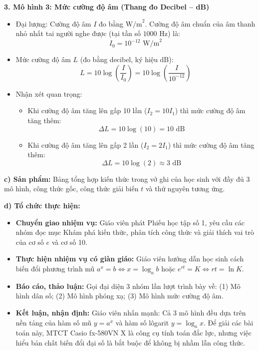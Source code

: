 \documentclass[12pt, a4paper]{article}
\begin{document}
\textbf{3. Mô hình 3: Mức cường độ âm (Thang đo Decibel -- dB)}
\begin{itemize}[leftmargin=0.6cm]
    \item Đại lượng: Cường độ âm $I$ đo bằng $\text{W/m}^2$. Cường độ âm chuẩn của âm thanh nhỏ nhất tai người nghe được (tại tần số $1000\text{ Hz}$) là:
    $$I_0 = 10^{-12} \text{ W/m}^2$$
    \item Mức cường độ âm $L$ (đo bằng decibel, ký hiệu $\text{dB}$):
    $$L = 10 \log\left(\dfrac{I}{I_0}\right) = 10 \log\left(\dfrac{I}{10^{-12}}\right)$$
    \item Nhận xét quan trọng:
    \begin{itemize}
        \item Khi cường độ âm tăng lên gấp 10 lần ($I_2 = 10 I_1$) thì mức cường độ âm tăng thêm:
        $$\Delta L = 10 \log(10) = 10 \text{ dB}$$
        \item Khi cường độ âm tăng lên gấp 2 lần ($I_2 = 2 I_1$) thì mức cường độ âm tăng thêm:
        $$\Delta L = 10 \log(2) \approx 3 \text{ dB}$$
    \end{itemize}
\end{itemize}

\noindent \textbf{c) Sản phẩm:}
Bảng tổng hợp kiến thức trong vở ghi của học sinh với đầy đủ 3 mô hình, công thức gốc, công thức giải biến $t$ và thứ nguyên tương ứng.

\noindent \textbf{d) Tổ chức thực hiện:}
\begin{itemize}[leftmargin=0.6cm]
    \item \textbf{Chuyển giao nhiệm vụ:} Giáo viên phát Phiếu học tập số 1, yêu cầu các nhóm đọc mục Khám phá kiến thức, phân tích công thức và giải thích vai trò của cơ số $e$ và cơ số 10.
    \item \textbf{Thực hiện nhiệm vụ có giàn giáo:} Giáo viên hướng dẫn học sinh cách biến đổi phương trình mũ $a^x = b \iff x = \log_a b$ hoặc $e^{rt} = K \iff rt = \ln K$.
    \item \textbf{Báo cáo, thảo luận:} Gọi đại diện 3 nhóm lần lượt trình bày về: (1) Mô hình dân số; (2) Mô hình phóng xạ; (3) Mô hình mức cường độ âm.
    \item \textbf{Kết luận, nhận định:} Giáo viên nhấn mạnh: Cả 3 mô hình đều dựa trên nền tảng của hàm số mũ $y = a^x$ và hàm số lôgarit $y = \log_a x$. Để giải các bài toán này, MTCT Casio fx-580VN X là công cụ tính toán đắc lực, nhưng việc hiểu bản chất biến đổi đại số là bắt buộc để không bị nhầm lẫn công thức.
\end{itemize}
\end{document}
